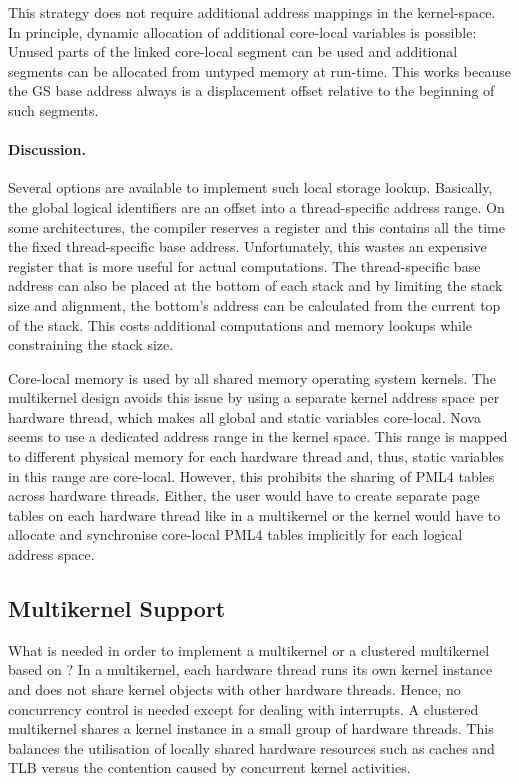 This strategy does not require additional address mappings in the kernel-space. In principle, dynamic allocation of additional core-local variables is possible: Unused parts of the linked core-local segment can be used and additional segments can be allocated from untyped memory at run-time. This works because the GS base address always is a displacement offset relative to the beginning of such segments.

\paragraph{Discussion.}
Several options are available to implement such local storage lookup. Basically, the global logical identifiers are an offset into a thread-specific address range. On some architectures, the compiler reserves a register and this contains all the time the fixed thread-specific base address. Unfortunately, this wastes an expensive register that is more useful for actual computations. The thread-specific base address can also be placed at the bottom of each stack and by limiting the stack size and alignment, the bottom's address can be calculated from the current top of the stack. This costs additional computations and memory lookups while constraining the stack size. 

Core-local memory is used by all shared memory operating system kernels. The multikernel design avoids this issue by using a separate kernel address space per hardware thread, which makes all global and static variables core-local. Nova seems to use a dedicated address range in the kernel space. This range is mapped to different physical memory for each hardware thread and, thus, static variables in this range are core-local. However, this prohibits the sharing of PML4 tables across hardware threads. Either, the user would have to create separate page tables on each hardware thread like in a multikernel or the kernel would have to allocate and synchronise core-local PML4 tables implicitly for each logical address space.
 

\subsection{Multikernel Support}
\label{sec:multikernel-phys}
What is needed in order to implement a multikernel or a clustered multikernel based on \mythos? In a multikernel, each hardware thread runs its own kernel instance and does not share kernel objects with other hardware threads. Hence, no concurrency control is needed except for dealing with interrupts. A clustered multikernel shares a kernel instance in a small group of hardware threads. This balances the utilisation of locally shared hardware resources such as caches and TLB versus the contention caused by concurrent kernel activities. 

